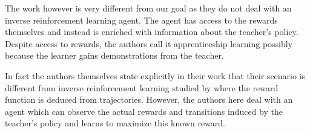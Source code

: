 The work however is very different from our goal as they do not deal with an inverse reinforcement learning agent. The agent has access to the rewards themselves and instead is enriched with information about the teacher's policy. Despite access to rewards, the authors call it apprenticeship learning possibly because the learner gains demonstrations from the teacher. 

 In fact the authors themselves state explicitly in their work that their scenario is different from inverse reinforcement learning studied by \citet{Abbeel:2004:ALV:1015330.1015430} where the reward function is deduced from trajectories. However, the authors here deal with an agent which can observe the actual rewards and transitions induced by the teacher's policy and learns to maximize this known reward.
